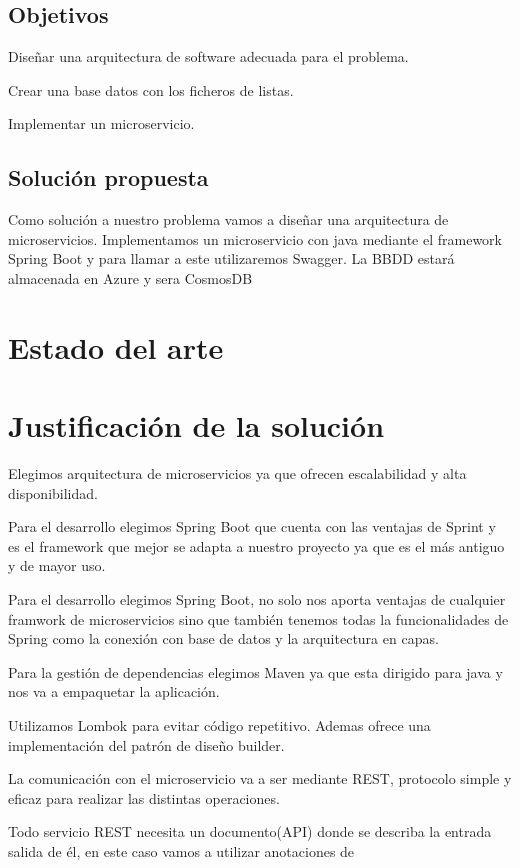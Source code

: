 \documentclass[12pt]{report} %
\begin{document}
	\subsection{Objetivos}
		
	Diseñar una arquitectura de software adecuada para el problema.
	
	Crear una base datos con los ficheros de listas.
	
	Implementar un microservicio.
	
	
	\subsection{Solución propuesta}
	Como solución a nuestro problema vamos a diseñar una arquitectura de microservicios.
	Implementamos un microservicio con java mediante el framework Spring Boot y para llamar a este utilizaremos Swagger.
	La BBDD estará almacenada en Azure y sera CosmosDB
	\section{Estado del arte}
	
	\section{Justificación de la solución}
	
	
	Elegimos arquitectura de microservicios ya que ofrecen escalabilidad y alta disponibilidad.
	
	Para el desarrollo elegimos Spring Boot que cuenta con las ventajas de Sprint y es el framework que mejor se adapta a nuestro proyecto ya que es el más antiguo y de mayor uso.
	
	Para el desarrollo elegimos Spring Boot, no solo nos aporta ventajas de cualquier framwork de microservicios sino que también tenemos todas la funcionalidades de Spring como la conexión con base de datos y la arquitectura en capas.
	
	Para la gestión de dependencias elegimos Maven ya que esta dirigido para java y nos va a empaquetar la aplicación.
	
	Utilizamos Lombok para evitar código repetitivo. Ademas ofrece una implementación del patrón de diseño builder.
	
	La comunicación con el microservicio va a ser mediante REST, protocolo simple y eficaz para realizar las distintas operaciones.
	
	Todo servicio REST necesita un documento(API) donde se describa la entrada salida de él, en este caso vamos a utilizar anotaciones de 
	
\end{document}
